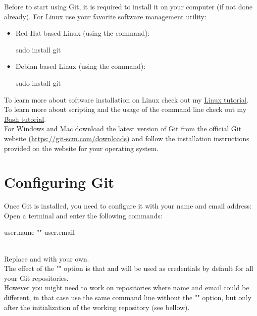 Before to start using Git, it is required to install it on your computer (if not done already). 
For Linux use your favorite software management utility: 
\begin{itemize}
\item Red Hat based Linux (using the  command):
\begin{scripti}
\fprompt{~} sudo  install git
\end{scripti}
\item Debian based Linux (using the  command):
\begin{scripti}
\uprompt{~} sudo  install git
\end{scripti}
\end{itemize}
To learn more about software installation on Linux check out my \href{https://www.ipcms.fr/wp-content/uploads/2021/11/linux.pdf}{Linux tutorial}. \\
To learn more about scripting and the usage of the command line check out my \href{https://www.ipcms.fr/wp-content/uploads/2021/05/bash.pdf}{Bash tutorial}.\\[0.25cm]
For Windows and Mac download the latest version of Git from the official Git website (\href{https://git-scm.com/downloads}{https://git-scm.com/downloads}) 
and follow the installation instructions provided on the website for your operating system.

\section{Configuring Git}
\label{gitconfig}
Once Git is installed, you need to configure it with your name and email address:
Open a terminal and enter the following commands:
\begin{script}
\fprompt{~}    user.name ""
\fprompt{~}    user.email \dctt{\email}
\end{script}
\\[-0.25cm]
\noindent Replace  and \dctt{\email} with your own. \\
The effect of the "" option is that  and \dctt{\email} will be used as credentials by default for all your Git repositories. \\
However you might need to work on repositories where name and email could be different, in that case use the same command line without the "" option, 
but only after the initialization of the working repository (see bellow).

